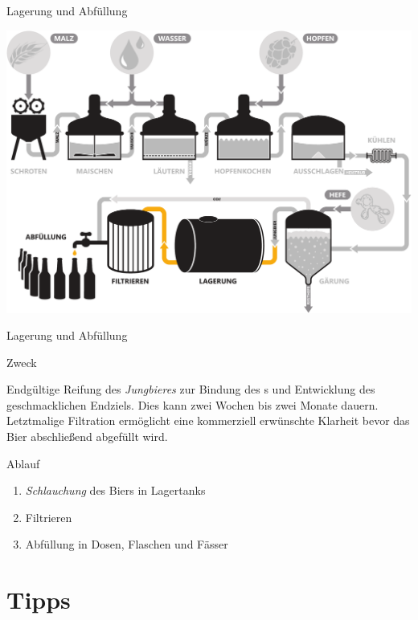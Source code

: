 \documentclass[9pt, ngerman]{beamer}
\begin{document}
\begin{frame}{Lagerung und Abfüllung}
  \begin{center}
    \vspace{0.5cm}
    \includegraphics[width=\textwidth]{pdfs/prozess-ende.pdf}
  \end{center}
\end{frame}
\begin{frame}{Lagerung und Abfüllung}
  \begin{block}{Zweck}
    \vspace{0.5em}

    Endgültige Reifung des \emph{Jungbieres} zur Bindung des s und
    Entwicklung des geschmacklichen Endziels. Dies kann zwei Wochen bis zwei
    Monate dauern. Letztmalige Filtration ermöglicht eine kommerziell erwünschte
    Klarheit bevor das Bier abschließend abgefüllt wird.

  \end{block}

  \begin{block}{Ablauf}
    \begin{enumerate}
      \item \emph{Schlauchung} des Biers in Lagertanks
      \item Filtrieren
      \item Abfüllung in Dosen, Flaschen und Fässer
    \end{enumerate}
  \end{block}
\end{frame}

\section{Tipps}
\end{document}
